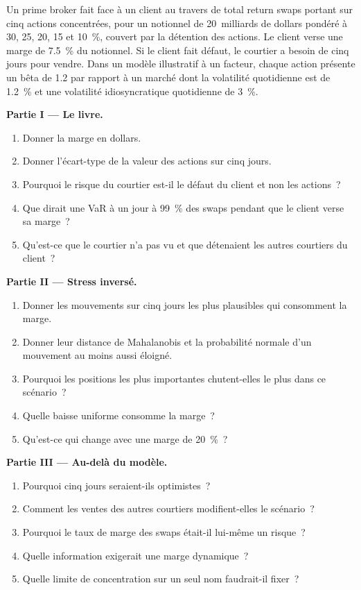 \begin{problem}\label{pb:rc:stress-testing-and-scenarios:1}
Un prime broker fait face à un client au travers de total return swaps portant sur cinq actions concentrées, pour un notionnel
de 20~milliards de dollars pondéré à 30, 25, 20, 15 et 10~\%, couvert par la détention des actions. Le client verse
une marge de 7.5~\% du notionnel. Si le client fait défaut, le courtier a besoin de cinq jours pour vendre. Dans un
modèle illustratif à un facteur, chaque action présente un bêta de 1.2 par rapport à un marché dont la volatilité quotidienne est de 1.2~\%
et une volatilité idiosyncratique quotidienne de 3~\%.

\medskip\noindent\textbf{Partie I --- Le livre.}
\begin{enumerate}
\item Donner la marge en dollars.
\item Donner l'écart-type de la valeur des actions sur cinq jours.
\item Pourquoi le risque du courtier est-il le défaut du client et non les actions~?
\item Que dirait une VaR à un jour à 99~\% des swaps pendant que le client verse sa marge~?
\item Qu'est-ce que le courtier n'a pas vu et que détenaient les autres courtiers du client~?
\end{enumerate}

\medskip\noindent\textbf{Partie II --- Stress inversé.}
\begin{enumerate}[resume]
\item Donner les mouvements sur cinq jours les plus plausibles qui consomment la marge.
\item Donner leur distance de Mahalanobis et la probabilité normale d'un mouvement au moins aussi éloigné.
\item Pourquoi les positions les plus importantes chutent-elles le plus dans ce scénario~?
\item Quelle baisse uniforme consomme la marge~?
\item Qu'est-ce qui change avec une marge de 20~\%~?
\end{enumerate}

\medskip\noindent\textbf{Partie III --- Au-delà du modèle.}
\begin{enumerate}[resume]
\item Pourquoi cinq jours seraient-ils optimistes~?
\item Comment les ventes des autres courtiers modifient-elles le scénario~?
\item Pourquoi le taux de marge des swaps était-il lui-même un risque~?
\item Quelle information exigerait une marge dynamique~?
\item Quelle limite de concentration sur un seul nom faudrait-il fixer~?
\end{enumerate}


\end{problem}
